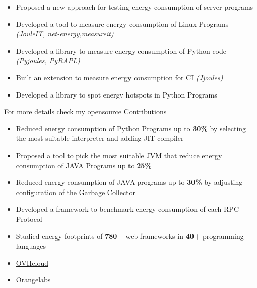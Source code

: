 \documentclass[10pt,a4paper,ragged2e,withhyper]{altacv}
\begin{document}
\begin{paracol}{2}
  \medskip

  \begin{itemize}
    \item Proposed a new approach for testing energy consumption of server programs
    \item Developed a tool to measure energy consumption of Linux Programs \emph{(JouleIT, net-energy,measureit)}
    \item Developed a library to measure energy consumption of Python code \emph{(Pyjoules, PyRAPL)}
    \item Built an extension to measure energy consumption for CI \emph{(Jjoules)}
    \item Developed a library to spot energy hotspots in Python Programs
  \end{itemize}
  For more details check my opensource Contributions
  \\
  \begin{itemize}
    \item Reduced energy consumption of Python Programs up to \textbf{30\%} by selecting the most suitable interpreter and adding JIT compiler
    \item Proposed a tool to pick the most suitable JVM that reduce energy consumption of JAVA Programs up to \textbf{25\%}
    \item Reduced energy consumption of JAVA programs up to \textbf{30\%} by adjusting configuration of the Garbage Collector
  \end{itemize}
  \begin{itemize}
    \item Developed a framework to benchmark energy consumption of each RPC Protocol
    \item Studied energy footprints of \textbf{780+} web frameworks in \textbf{40+} programming languages
  \end{itemize}
  \begin{itemize}
    \item \href{https://www.ovhcloud.com}{OVHcloud}
    \item \href{https://lelab.orange.fr}{Orangelabs}

\end{itemize}
\end{paracol}
\end{document}

